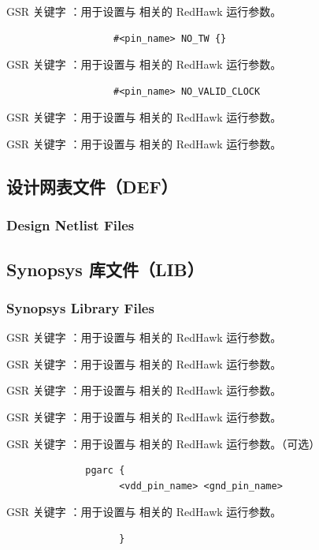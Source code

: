GSR 关键字 ：用于设置与  相关的 RedHawk 运行参数。

\begin{lstlisting}
                   #<pin_name> NO_TW {}
\end{lstlisting}

GSR 关键字 ：用于设置与  相关的 RedHawk 运行参数。

\begin{lstlisting}
                   #<pin_name> NO_VALID_CLOCK
\end{lstlisting}

GSR 关键字 ：用于设置与  相关的 RedHawk 运行参数。

GSR 关键字 ：用于设置与  相关的 RedHawk 运行参数。

\subsection{设计网表文件（DEF）}
\subsubsection*{Design Netlist Files}

\subsection{Synopsys 库文件（LIB）}
\subsubsection*{Synopsys Library Files}

GSR 关键字 ：用于设置与  相关的 RedHawk 运行参数。

GSR 关键字 ：用于设置与  相关的 RedHawk 运行参数。

GSR 关键字 ：用于设置与  相关的 RedHawk 运行参数。

GSR 关键字 ：用于设置与  相关的 RedHawk 运行参数。

GSR 关键字 ：用于设置与  相关的 RedHawk 运行参数。（可选）

\begin{lstlisting}
              pgarc {
                    <vdd_pin_name> <gnd_pin_name>
\end{lstlisting}

GSR 关键字 ：用于设置与  相关的 RedHawk 运行参数。

\begin{lstlisting}
                    }
\end{lstlisting}

